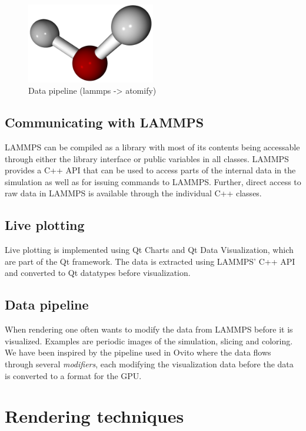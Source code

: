 \documentclass[aps,pre,twocolumn,letterpaper,floatfix,nofootinbib]{revtex4}
\begin{document}
\begin{figure}
	\centering
	\includegraphics[width=0.5\textwidth]{final_billboard.png}
	\caption{Data pipeline (lammps -> atomify)}
	\label{fig:gui}
\end{figure}

\subsection{Communicating with LAMMPS}

LAMMPS can be compiled as a library with most of its contents being accessable
through either the library interface or public variables in all classes.
LAMMPS provides a C++ API that can be used to access parts of the internal data
in the simulation as well as for issuing commands to LAMMPS.
Further, direct access to raw data in LAMMPS is available through the individual
C++ classes.

\subsection{Live plotting}

Live plotting is implemented using Qt Charts and Qt Data Visualization,
which are part of the Qt framework.
The data is extracted using LAMMPS' C++ API and converted to Qt datatypes before
visualization.

\subsection{Data pipeline}

When rendering one often wants to modify the data
from LAMMPS before it is visualized.
Examples are periodic images of the simulation,
slicing and coloring.
We have been inspired by the pipeline used in Ovito where the data flows through
several \textit{modifiers}, each modifying the visualization data before the
data is converted to a format for the GPU.

\section{Rendering techniques}
\end{document}
